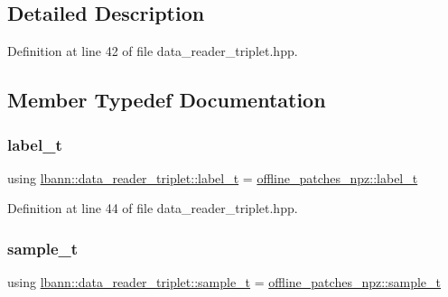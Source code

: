 \subsection{Detailed Description}


Definition at line 42 of file data\+\_\+reader\+\_\+triplet.\+hpp.



\subsection{Member Typedef Documentation}
\mbox{\label{classlbann_1_1data__reader__triplet_a7b18fbd40987c99e1c839efc12567fb7}} 
\subsubsection{\texorpdfstring{label\+\_\+t}{label\_t}}
{\footnotesize\ttfamily using \hyperlink{classlbann_1_1data__reader__triplet_a7b18fbd40987c99e1c839efc12567fb7}{lbann\+::data\+\_\+reader\+\_\+triplet\+::label\+\_\+t} =  \hyperlink{classlbann_1_1offline__patches__npz_ae0ed6bf62b2be1814964206522ed4e05}{offline\+\_\+patches\+\_\+npz\+::label\+\_\+t}}



Definition at line 44 of file data\+\_\+reader\+\_\+triplet.\+hpp.

\mbox{\label{classlbann_1_1data__reader__triplet_adddc55e0424d38b60ac5f55c16990bb7}} 
\subsubsection{\texorpdfstring{sample\+\_\+t}{sample\_t}}
{\footnotesize\ttfamily using \hyperlink{classlbann_1_1data__reader__triplet_adddc55e0424d38b60ac5f55c16990bb7}{lbann\+::data\+\_\+reader\+\_\+triplet\+::sample\+\_\+t} =  \hyperlink{classlbann_1_1offline__patches__npz_a61405205f907a697515786d0a9e7858a}{offline\+\_\+patches\+\_\+npz\+::sample\+\_\+t}}



